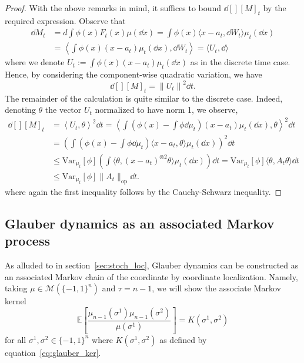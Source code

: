 \begin{proof}
  With the above remarks in mind, it suffices to bound \(\dd[] [M]_t\) by the required expression. 
  Observe that
  \begin{align*}
    \dd M_t & = d \int \phi(x) F_t(x) \mu(\dd x) = \int \phi(x) \langle x - a_t, \dd W_t \rangle \mu_t(\dd x)\\
    & = \left\langle \int \phi(x)(x - a_t)\mu_t(\dd x), \dd W_t\right\rangle = \langle U_t, \dd \rangle
  \end{align*}
  where we denote \(U_t := \int \phi(x)(x - a_t)\mu_t(\dd x)\) as in the discrete time case.
  Hence, by considering the component-wise quadratic variation, we have
  \begin{equation}\label{eq:diff_qvar}
    \dd[] [M]_t = \left\| U_t \right\|^2 \dd t.
  \end{equation}
  The remainder of the calculation is quite similar to the discrete case. Indeed, denoting \(\theta\) the vector 
  \(U_t\) normalized to have norm 1, we observe,
  \begin{equation}\label{eq:red_a}
    \begin{split}
      \dd[] [M]_t & = \left\langle U_t, \theta \right\rangle^2 \dd t
        = \left\langle \int \left(\phi(x) - \int \phi \dd \mu_t\right)(x - a_t)\mu_t(\dd x), \theta\right\rangle^2 \dd t\\
      & = \left(\int \left(\phi(x) - \int \phi \dd \mu_t\right) \langle x - a_t, \theta\rangle \mu_t(\dd x)\right)^2 \dd t\\
      & \le \text{Var}_{\mu_t}[\phi] \left(\int \langle\theta, (x - a_t)^{\otimes 2} \theta\rangle \mu_t(\dd x)\right) \dd t
        = \text{Var}_{\mu_t}[\phi] \langle\theta, A_t \theta\rangle\dd t\\ 
      & \le \text{Var}_{\mu_t}[\phi] \|A_t\|_{\text{op}} \dd t.
    \end{split}
  \end{equation}
  where again the first inequality follows by the Cauchy-Schwarz inequality.
\end{proof}

\subsection{Glauber dynamics as an associated Markov process}\label{sec:Glauber_loc}

As alluded to in section~\ref{sec:stoch_loc}, Glauber dynamics can be constructed as an associated Markov 
chain of the coordinate by coordinate localization. Namely, taking \(\mu \in \mathcal{M}(\{-1, 1\}^n)\)
and \(\tau = n - 1\), we will show the associate Markov kernel 
\[\mathbb{E}\left[\frac{\mu_{n - 1}(\sigma^1)\mu_{n - 1}(\sigma^2)}{\mu(\sigma^1)}\right] = K(\sigma^1, \sigma^2)\]
for all \(\sigma^1, \sigma^2 \in \{-1, 1\}^n\) where \(K(\sigma^1, \sigma^2)\) as defined by equation~\eqref{eq:glauber_ker}.

